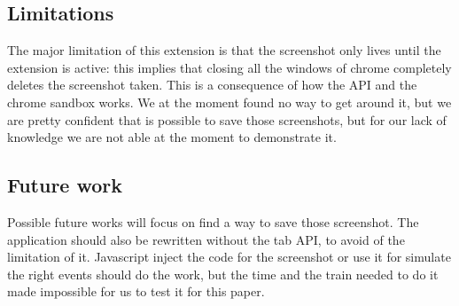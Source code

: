 \documentclass[12pt]{article}
\begin{document}
\begin{multicols}{2}
\subsection*{Limitations}
The major limitation of this extension is that the screenshot only lives until the extension is active: this implies that closing all the windows of chrome completely deletes the screenshot taken.
This is a consequence of how the API and the chrome sandbox works. We at the moment found no way to get around it, but we are pretty confident that is possible to save those screenshots, but for our lack of knowledge we are not able at the moment to demonstrate it.
\subsection*{Future work}
Possible future works will focus on find a way to save those screenshot.
The application should also be rewritten without the tab API, to avoid of the limitation of it.
Javascript inject the code for the screenshot or use it for simulate the right events should do the work, but the time and the train needed to do it made impossible for us to test it for this paper.

\end{multicols}
\end{document}
